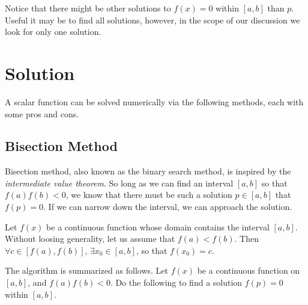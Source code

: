 Notice that there might be other solutions to $f(x)=0$ within $\left[a, b\right]$ than $p$. Useful it may be to find all solutions, however, in the scope of our discussion we look for only one solution. 

\section{Solution}

A scalar function can be solved numerically via the following methods, each with some pros and cons.

\subsection{Bisection Method}

Bisection method, also known as the binary search method, is inspired by the \textit{intermediate value theorem}. So long as we can find an interval $\left[a, b\right]$ so that $f(a)f(b)<0$, we know that there must be such a solution $p\in\left[a, b\right]$ that $f(p)=0$. If we can narrow down the interval, we can approach the solution.

\begin{shortbox}

Let $f(x)$ be a continuous function whose domain contains the interval $\left[a, b\right]$. Without loosing generality, let us assume that $f(a)<f(b)$. Then $\forall c \in \left[f(a), f(b)\right]$, $\exists x_0 \in \left[a, b\right]$, so that $f(x_0)=c$.

\end{shortbox}

The algorithm is summarized as follows. Let $f(x)$ be a continuous function on $\left[a, b\right]$, and $f(a)f(b)<0$. Do the following to find a solution $f(p)=0$ within $\left[a, b\right]$.

